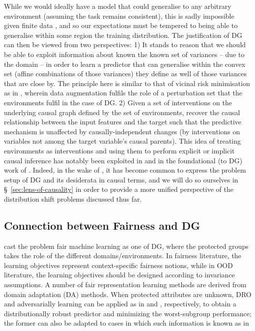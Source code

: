 %
While we would ideally have a model that could generalise to any arbitrary environment (assuming
the task remains consistent), this is sadly impossible given finite data
\cite{david2010impossibility}, and so our expectations must be tempered to being able to generalise
within some region the training distribution.
%
The justification of DG can then be viewed from two perspectives: 1) It stands to reason that we
should be able to exploit information about known the known set of variances -- due to the domain
-- in order to learn a predictor that can generalise within the convex set (affine combinations of
those variances) they define as well of those variances that are close by.
%
The principle here is similar to that of vicinal risk minimisation \citep{chapelle2000vicinal} as
in \cite{zhang2017mixup}, wherein data augmentation fulfils the role of a perturbation set that the
environments fulfil in the case of DG.
%
2) Given a set of interventions on the underlying causal graph defined by the set of environments,
recover the causal relationship between the input features and the target such that the predictive
mechanism is unaffected by causally-independent changes (by interventions on variables not among
the target variable's causal parents).
%
This idea of treating environments as interventions and using them to perform explicit or implicit
causal inference has notably been exploited in \cite{peters2016causal} and in the foundational (to
DG) work of \cite{arjovsky2019invariant}.
%
Indeed, in the wake of \cite{arjovsky2019invariant}, it has become common \citep{
gulrajani2020search, krueger2021out, mahajan2021domain, lin2022zin} to express the problem setup of
DG and its desiderata in causal terms, and we will do so ourselves in
\S~\ref{sec:lens-of-causality} in order to provide a more unified perspective of the distribution
shift problems discussed thus far.

\subsection{Connection between Fairness and DG}\label{ssec:fairml-dg-cxn}
\citet{creager2021environment} cast the problem fair machine learning as one of DG,
where the protected groups takes the role of the different domains/environments. 
%
In fairness literature, the learning objectives represent context-specific fairness notions, while
in OOD literature, the learning objectives should be designed according to invariance assumptions.
%
A number of fair representation learning methods \citep{edwards2015censoring, madras2018learning}
are derived from domain adaptation (DA) methods. When protected attributes are unknown, DRO and
adversarially learning can be applied as in \citet{hashimoto2018fairness} and
\citet{lahoti2020fairness}, respectively, to obtain a distributionally robust predictor and
minimizing the worst-subgroup performance; the former can also be adapted to cases in which such
information is known as in \citet{sagawa2019distributionally} 

